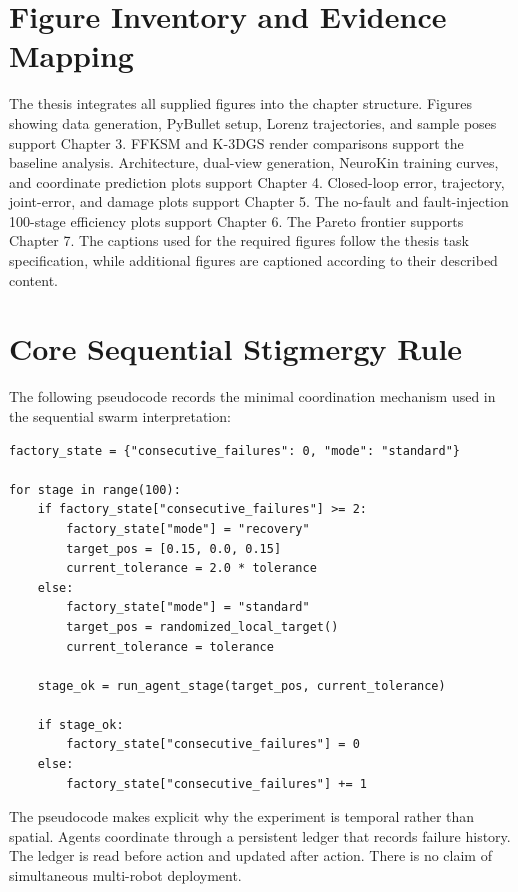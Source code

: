 \documentclass[12pt,a4paper,oneside]{report}
\begin{document}
\appendix

\chapter{Figure Inventory and Evidence Mapping}

The thesis integrates all supplied figures into the chapter structure. Figures showing data generation, PyBullet setup, Lorenz trajectories, and sample poses support Chapter 3. FFKSM and K-3DGS render comparisons support the baseline analysis. Architecture, dual-view generation, NeuroKin training curves, and coordinate prediction plots support Chapter 4. Closed-loop error, trajectory, joint-error, and damage plots support Chapter 5. The no-fault and fault-injection 100-stage efficiency plots support Chapter 6. The Pareto frontier supports Chapter 7. The captions used for the required figures follow the thesis task specification, while additional figures are captioned according to their described content.

\chapter{Core Sequential Stigmergy Rule}

The following pseudocode records the minimal coordination mechanism used in the sequential swarm interpretation:

\begin{verbatim}
factory_state = {"consecutive_failures": 0, "mode": "standard"}

for stage in range(100):
    if factory_state["consecutive_failures"] >= 2:
        factory_state["mode"] = "recovery"
        target_pos = [0.15, 0.0, 0.15]
        current_tolerance = 2.0 * tolerance
    else:
        factory_state["mode"] = "standard"
        target_pos = randomized_local_target()
        current_tolerance = tolerance

    stage_ok = run_agent_stage(target_pos, current_tolerance)

    if stage_ok:
        factory_state["consecutive_failures"] = 0
    else:
        factory_state["consecutive_failures"] += 1
\end{verbatim}

The pseudocode makes explicit why the experiment is temporal rather than spatial. Agents coordinate through a persistent ledger that records failure history. The ledger is read before action and updated after action. There is no claim of simultaneous multi-robot deployment.
\end{document}
